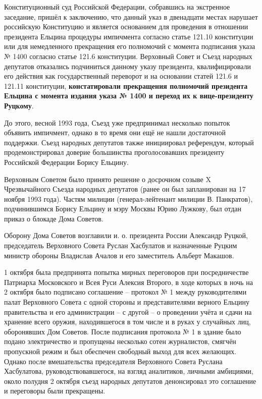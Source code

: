 \documentclass[a4paper,12pt]{diss_4}
\begin{document}
Конституционный суд Российской Федерации, собравшись на экстренное заседание, пришёл к заключению, что данный указ в двенадцати местах нарушает российскую Конституцию и является основанием для проведения в отношении президента Ельцина процедуры импичмента согласно статье 121.10 конституции или для немедленного прекращения его полномочий с момента подписания указа № 1400 согласно статье 121.6 конституции. Верховный Совет и Съезд народных депутатов отказались подчиниться данному указу президента, квалифицировали его действия как государственный переворот и на основании статей 121.6 и 121.11 конституции, \textbf{констатировали прекращения полномочий президента Ельцина с момента издания указа № 1400 и переход их к вице-президенту Руцкому}.

До этого, весной 1993 года, Съезд уже предпринимал несколько попыток объявить импичмент, однако в то время они ещё не нашли достаточной поддержки. Съезд народных депутатов также инициировал референдум, который продемонстрировал доверие большинства проголосовавших президенту Российской Федерации Борису Ельцину.

Верховным Советом было принято решение о досрочном созыве X Чрезвычайного Съезда народных депутатов (ранее он был запланирован на 17 ноября 1993 года). Частям милиции (генерал-лейтенант милиции В. Панкратов), подчинившимся Борису Ельцину и мэру Москвы Юрию Лужкову, был отдан приказ о блокаде Дома Советов.

Оборону Дома Советов возглавили и. о. президента России Александр Руцкой, председатель Верховного Совета Руслан Хасбулатов и назначенные Руцким министр обороны Владислав Ачалов и его заместитель Альберт Макашов.

1 октября была предпринята попытка мирных переговоров при посредничестве Патриарха Московского и Всея Руси Алексия Второго, в ходе которых в ночь на 2 октября было подписано соглашение -- протокол № 1 между руководителями палат Верховного Совета с одной стороны и представителями верного Ельцину правительства и его администрации -- с другой -- о проведении учёта и сдачи на хранение всего оружия, находившегося в том числе и в руках у случайных лиц, оборонявших Дом Советов. После подписания протокола № 1 в здание было подано электричество и пропущены несколько сотен журналистов, смягчён пропускной режим и был обеспечен свободный выход для всех желающих. Однако после вмешательства председателя Верховного Совета Руслана Хасбулатова, руководствовавшегося, на взгляд аналитиков, личными амбициями, около полудня 2 октября съезд народных депутатов денонсировал это соглашение и переговоры были прекращены.
\end{document}
